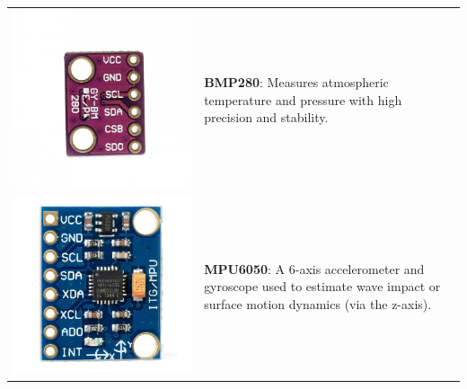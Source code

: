 \documentclass{article}
\begin{document}
    \begin{tabular}{@{}m{} m{}@{}}
        \includegraphics[width=0.9\linewidth, angle=90]{assets/bmp280.jpg} &
        \textbf{BMP280}: Measures atmospheric temperature and pressure with high precision and stability. \\
        
        \hspace{7mm} \includegraphics[width=0.6\linewidth]{assets/mpu6050.jpeg} &
        \textbf{MPU6050}: A 6-axis accelerometer and gyroscope used to estimate wave impact or surface motion dynamics (via the z-axis). \\
        

\end{tabular}
\end{document}
